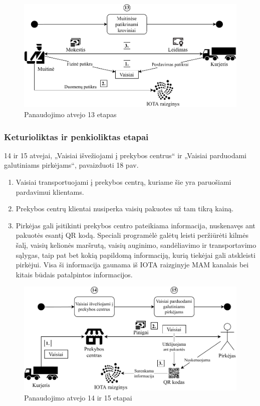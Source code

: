\begin{figure}[H]
    \centering
    \includegraphics[scale=0.7]{images/iota-usecase-13}
    \caption{Panaudojimo atvejo 13 etapas}
\end{figure}




\subsubsection{Keturioliktas ir penkioliktas etapai}

14 ir 15 atvejai, „Vaisiai išvežiojami į prekybos centrus“ ir „Vaisiai parduodami galutiniams pirkėjams“, pavaizduoti 18 pav.
\begin{enumerate}
    \item Vaisiai transportuojami į prekybos centrą, kuriame šie yra paruošiami pardavimui klientams.
    \item Prekybos centrų klientai nusiperka vaisių pakuotes už tam tikrą kainą.
    \item Pirkėjas gali įsitikinti prekybos centro pateikiama informacija, nuskenavęs ant pakuotės esantį QR kodą. Speciali programėlė galėtų leisti peržiūrėti kilmės šalį, vaisių kelionės maršrutą, vaisių auginimo, sandėliavimo ir transportavimo sąlygas, taip pat bet kokią papildomą informaciją, kurią tiekėjai gali atskleisti pirkėjui. Visa ši informacija gaunama iš IOTA raizginyje MAM kanalais bei kitais būdais patalpintos informacijos.
\end{enumerate}

\begin{figure}[H]
    \centering
    \includegraphics[scale=0.7]{images/iota-usecase-14-15}
    \caption{Panaudojimo atvejo 14 ir 15 etapai}
\end{figure}